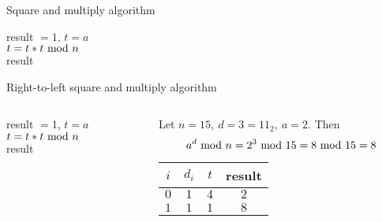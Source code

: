 \begin{frame}{Square and multiply algorithm}
    \begin{algorithm}[H]
result $= 1$, $t = a$\\
 	{
  		$t=t*t\textrm{~mod~} n$\\
  	}
  	\Return result\\
	\caption{Right-to-left square and multiply algorithm for computing modular exponentiation}
\end{algorithm}
\end{frame}


\begin{frame}{Right-to-left square and multiply algorithm}
\begin{columns}[T] %
\begin{column}{.4\textwidth}
{
\setlength{\interspacetitleruled}{0pt}%
\setlength{\algotitleheightrule}{0pt}%
\begin{algorithm}[H]
result $= 1$, $t = a$\\
 	{
  		$t=t*t\textrm{~mod~} n$\\
  	}
  	\Return result
\end{algorithm}
}
\end{column}%
\hfill%
\begin{column}{.6\textwidth}
\begin{example}
    Let $n=15,\ d=3=11_2,\  a=2$.
    Then
    \[
    a^d\textrm{~mod~} n=2^3\textrm{~mod~}15=8\textrm{~mod~}15=8
    \]
 \begin{center}
        \begin{tabular}{c|c|c|c}
     $i$ & $d_i$  &  $t$  & result\\\hline
     $0$ & $1$    &  $4$  &  $2$ \\
     $1$ & $1$    &  $1$  &  $8$
    \end{tabular}
    \end{center}
\end{example}
\end{column}%
\end{columns}
\end{frame}

